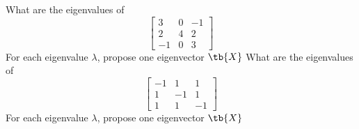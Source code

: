 \bexo
What are the eigenvalues of 
\begin{equation*}
\left[
\begin{array}{ccc}
3 & 0 & -1\\
2 & 4 & 2\\
-1 & 0 & 3
\end{array}
\right]
\end{equation*}
For each eigenvalue $\lambda$, propose one eigenvector $\tb{X}$
\eexo{}
\bexo
What are the eigenvalues of 
\begin{equation*}
\left[
\begin{array}{ccc}
-1 & 1 & 1 \\
1 & -1 & 1 \\
1 & 1 & -1
\end{array}
\right]
\end{equation*}
For each eigenvalue $\lambda$, propose one eigenvector $\tb{X}$
\eexo{}

